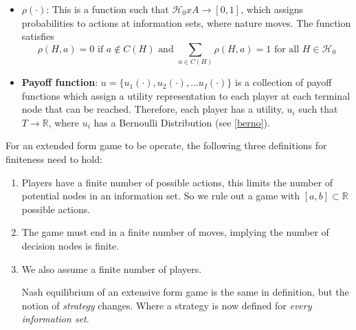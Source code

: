\documentclass{article}
\begin{document}
\begin{itemize}
    \item \textbf{$\rho(\cdot)$}: This is a function such that $\mathcal{H}_{0} x A \rightarrow [0,1]$, which assigns probabilities to actions at information sets, where nature moves. The function satisfies 
    \[
    \rho(H, a) = 0 \text{ if } a \notin C(H) \text{ and } \sum_{a \in C(H)} \rho(H,a) = 1 \text{ for all } H \in \mathcal{H}_0
    \]
    \item \textbf{Payoff function}: $u = \{u_{1}(\cdot), u_{2}(\cdot), ... u_{I}(\cdot) \}$ is a collection of payoff functions which assign a utility representation to each player at each terminal node that can be reached. Therefore, each player has a utility, $u_i$ such that $T \rightarrow \mathbb{R}$, where $u_i$ has a Bernoulli Distribution (see \ref{berno}). 
    
\end{itemize}

\noindent For an extended form game to be operate, the following three definitions for finiteness need to hold:
\begin{enumerate}
    \item Players have a finite number of possible actions, this limits the number of potential nodes in an information set. So we rule out a game with $[a,b] \subset \mathbb{R}$ possible actions. 
    \item The game must end in a finite number of moves, implying the number of decision nodes is finite. 
    \item We also assume a finite number of players.

\noindent Nash equilibrium of an extensive form game is the same in definition, but the notion of \textit{strategy} changes. Where a strategy is now defined for \textit{every information set}. 


\end{enumerate}
\end{document}
